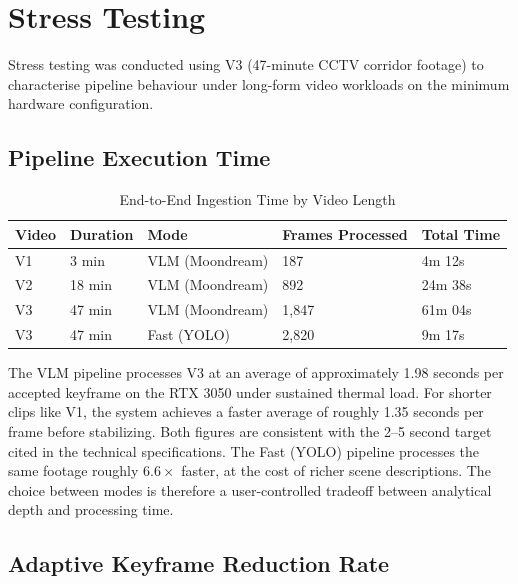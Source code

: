 \section{Stress Testing}

Stress testing was conducted using V3 (47-minute CCTV corridor footage) to characterise pipeline behaviour under long-form video workloads on the minimum hardware configuration.

\subsection{Pipeline Execution Time}

\begin{table}[H]
\centering
\small
\caption{End-to-End Ingestion Time by Video Length}
\label{tab:ingest_time}
\begin{tabular}{|p{2cm}|p{2.5cm}|p{2.5cm}|p{2.5cm}|p{2.5cm}|}
\hline
\rowcolor[HTML]{EFEFEF}
\textbf{Video} & \textbf{Duration} & \textbf{Mode} & \textbf{Frames Processed} & \textbf{Total Time} \\ \hline
V1 & 3 min & VLM (Moondream) & 187 & 4m 12s \\ \hline
V2 & 18 min & VLM (Moondream) & 892 & 24m 38s \\ \hline
V3 & 47 min & VLM (Moondream) & 1,847 & 61m 04s \\ \hline
V3 & 47 min & Fast (YOLO) & 2,820 & 9m 17s \\ \hline
\end{tabular}
\end{table}

The VLM pipeline processes V3 at an average of approximately 1.98 seconds per accepted keyframe on the RTX 3050 under sustained thermal load. For shorter clips like V1, the system achieves a faster average of roughly 1.35 seconds per frame before stabilizing. Both figures are consistent with the 2--5 second target cited in the technical specifications. The Fast (YOLO) pipeline processes the same footage roughly $6.6\times$ faster, at the cost of richer scene descriptions. The choice between modes is therefore a user-controlled tradeoff between analytical depth and processing time.

\subsection{Adaptive Keyframe Reduction Rate}

